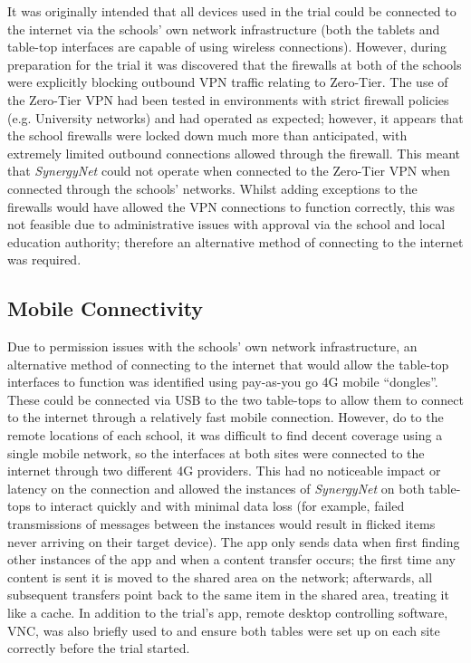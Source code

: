 \documentclass[twocolumn]{svjour3}          %
\begin{document}
It was originally intended that all devices used in the trial could be connected to the internet via the schools' own network infrastructure (both the tablets and table-top interfaces are capable of using wireless connections).
However, during preparation for the trial it was discovered that the firewalls at both of the schools were explicitly blocking outbound VPN traffic relating to Zero-Tier.
The use of the Zero-Tier VPN had been tested in environments with strict firewall policies (e.g. University networks) and had operated as expected; however, it appears that the school firewalls were locked down much more than anticipated, with extremely limited outbound connections allowed through the firewall.
This meant that {\emph{SynergyNet}} could not operate when connected to the Zero-Tier VPN when connected through the schools’ networks.
Whilst adding exceptions to the firewalls would have allowed the VPN connections to function correctly, this was not feasible due to administrative issues with approval via the school and local education authority; therefore an alternative method of connecting to the internet was required.

\subsection{Mobile Connectivity}

Due to permission issues with the schools' own network infrastructure, an alternative method of connecting to the internet that would allow the table-top interfaces to function was identified using pay-as-you go 4G mobile ``dongles''.
These could be connected via USB to the two table-tops to allow them to connect to the internet through a relatively fast mobile connection.
However, do to the remote locations of each school, it was difficult to find decent coverage using a single mobile network, so the interfaces at both sites were connected to the internet through two different 4G providers.
This had no noticeable impact or latency on the connection and allowed the instances of {\emph{SynergyNet}} on both table-tops to interact quickly and with minimal data loss (for example, failed transmissions of messages between the instances would result in flicked items never arriving on their target device).
The app only sends data when first finding other instances of the app and when a content transfer occurs; the first time any content is sent it is moved to the shared area on the network; afterwards, all subsequent transfers point back to the same item in the shared area, treating it like a cache.
In addition to the trial's app, remote desktop controlling software, VNC, was also briefly used to and ensure both tables were set up on each site correctly before the trial started.
\end{document}
